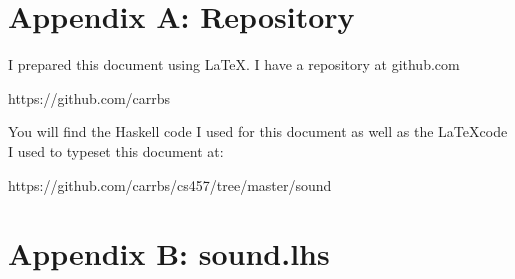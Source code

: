 \documentclass[12pt]{article}
\begin{document}
\section{Appendix A: Repository}

I prepared this document using \LaTeX. I have a repository at github.com
\begin{center}
https://github.com/carrbs
\end{center}

You will find the Haskell code I used for this document as well as the \LaTeX code I used to typeset this document at:
\begin{center}
https://github.com/carrbs/cs457/tree/master/sound
\end{center}


\section{Appendix B: sound.lhs}
\end{document}
